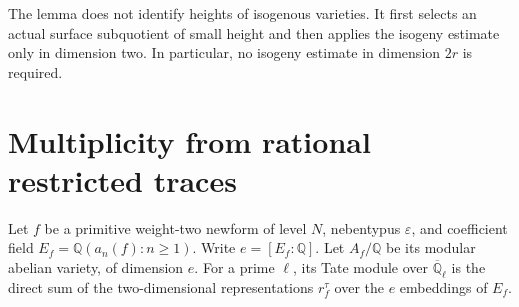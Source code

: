 \documentclass[11pt,a4paper]{article}
\newcommand{\Q}{\mathbb Q}
\begin{document}
The lemma does not identify heights of isogenous varieties.
It first selects an actual surface subquotient of small height and
then applies the isogeny estimate only in dimension two. In particular,
no isogeny estimate in dimension \(2r\) is required.

\section{Multiplicity from rational restricted traces}

Let \(f\) be a primitive weight-two newform of level \(N\), nebentypus
\(\varepsilon\), and coefficient field
\(E_f=\Q(a_n(f):n\ge1)\). Write \(e=[E_f:\Q]\).
Let \(A_f/\Q\) be its modular abelian variety, of dimension \(e\).
For a prime \(\ell\), its Tate module over \(\overline{\Q}_\ell\)
is the direct sum of the two-dimensional representations \(r_f^\tau\)
over the \(e\) embeddings of \(E_f\).
\end{document}

